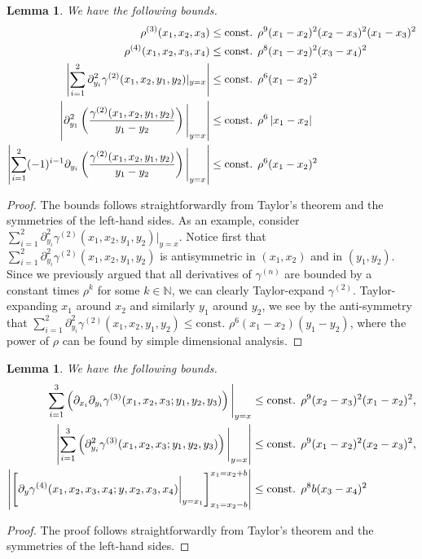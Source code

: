 \documentclass[a4paper,11pt]{article}
\newcommand{\abs}[1]{\left\lvert #1 \right\rvert}
\newtheorem{lemma}[theorem]{Lemma}
\numberwithin{equation}{section}
\begin{document}
	\begin{lemma}\label{LemmaDensityBounds}
		We have the following bounds.\begin{equation}
		\begin{aligned}
		\rho^{(3)}(x_1,x_2,x_3)&\leq \textnormal{const. }\rho^9(x_1-x_2)^2(x_2-x_3)^2(x_1-x_3)^2\\
		\rho^{(4)}(x_1,x_2,x_3,x_4)&\leq \textnormal{const. }\rho^8(x_1-x_2)^2(x_3-x_4)^2\\
		\abs{\sum_{i=1}^{2}\partial_{y_i}^2\gamma^{(2)}(x_1,x_2,y_1,y_2)\rvert_{y=x}}&\leq \textnormal{const. } \rho^{6}(x_1-x_2)^2\\
		\abs{\partial_{y_1}^2\left(\frac{\gamma^{(2)}(x_1,x_2,y_1,y_2)}{y_1-y_2}\right)\Bigg\rvert_{y=x}}&\leq \textnormal{const. } \rho^{6}\abs{x_1-x_2}\\
		\abs{\sum_{i=1}^{2}(-1)^{i-1}\partial_{y_i}\left(\frac{\gamma^{(2)}(x_1,x_2,y_1,y_2)}{y_1-y_2}\right)\Bigg\rvert_{y=x}}&\leq \textnormal{const. } \rho^{6}(x_1-x_2)^2
		\end{aligned}
		\end{equation}
	\end{lemma}
	\begin{proof}
		The bounds follows straightforwardly from Taylor's theorem and the symmetries of the left-hand sides. As an example, consider $ \sum_{i=1}^{2}\partial_{y_i}^2\gamma^{(2)}(x_1,x_2,y_1,y_2)\rvert_{y=x} $. Notice first that $ \sum_{i=1}^{2}\partial_{y_i}^2\gamma^{(2)}(x_1,x_2,y_1,y_2) $ is antisymmetric in $ (x_1,x_2) $ and in $ (y_1,y_2) $. Since we previously argued that all derivatives of $ \gamma^{(n)} $ are bounded by a constant times $ \rho^k $ for some $ k\in\mathbb{N} $, we can clearly Taylor-expand $ \gamma^{(2)} $. Taylor-expanding $ x_1 $ around $ x_2 $ and similarly $ y_1 $ around $ y_2 $, we see by the anti-symmetry that $ \sum_{i=1}^{2}\partial_{y_i}^2\gamma^{(2)}(x_1,x_2,y_1,y_2)\leq \text{const. }\rho^6(x_1-x_2)(y_1-y_2) $, where the power of $ \rho $ can be found by simple dimensional analysis.
	\end{proof}
	\begin{lemma} \label{LemmaDensityBounds2}
		We have the following bounds.
		\begin{equation}
		\begin{aligned}
		\sum_{i=1}^{3}\left(\partial_{x_i}\partial_{y_i}\gamma^{(3)}(x_1,x_2,x_3;y_1,y_2,y_3)\right)\Bigg\vert_{y=x}&\leq \textnormal{const. }\rho^9(x_2-x_3)^2(x_1-x_2)^2,\\
		\abs{\sum_{i=1}^{3}\left(\partial_{y_i}^2\gamma^{(3)}(x_1,x_2,x_3;y_1,y_2,y_3)\right)\Bigg\vert_{y=x}}&\leq\textnormal{const. }\rho^9(x_1-x_2)^2(x_2-x_3)^2,\\
		\abs{\left[\partial_{y}\gamma^{(4)}(x_1,x_2,x_3,x_4;y,x_2,x_3,x_4)\bigg\vert_{y=x_1}\right]_{x_1=x_2-b}^{x_1=x_2+b}}&\leq \textnormal{const. }\rho^8b(x_3-x_4)^2
		\end{aligned}
		\end{equation}
	\end{lemma}
	\begin{proof}
		The proof follows straightforwardly from Taylor's theorem and the symmetries of the left-hand sides. 
	\end{proof}
\end{document}

